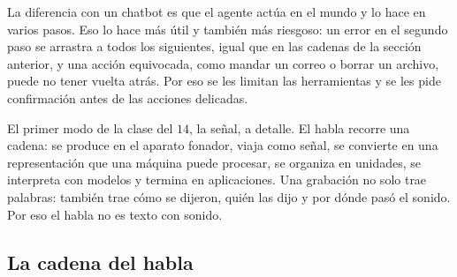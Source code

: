 \documentclass[11pt,letterpaper]{article}
\begin{document}
La diferencia con un chatbot es que el agente actúa en el mundo y lo
hace en varios pasos. Eso lo hace más útil y también más riesgoso: un
error en el segundo paso se arrastra a todos los siguientes, igual que
en las cadenas de la sección anterior, y una acción equivocada, como
mandar un correo o borrar un archivo, puede no tener vuelta atrás.
Por eso se les limitan las herramientas y se les pide confirmación
antes de las acciones delicadas.


\newpage


\begin{quick_sum}
    El primer modo de la clase del $14$, la señal, a detalle. El habla
    recorre una cadena: se produce en el aparato fonador, viaja como
    señal, se convierte en una representación que una máquina puede
    procesar, se organiza en unidades, se interpreta con modelos y
    termina en aplicaciones. Una grabación no solo trae palabras:
    también trae cómo se dijeron, quién las dijo y por dónde pasó el
    sonido. Por eso el habla no es texto con sonido.
\end{quick_sum}

\subsection*{La cadena del habla}

\begin{center}
\end{center}
\end{document}
